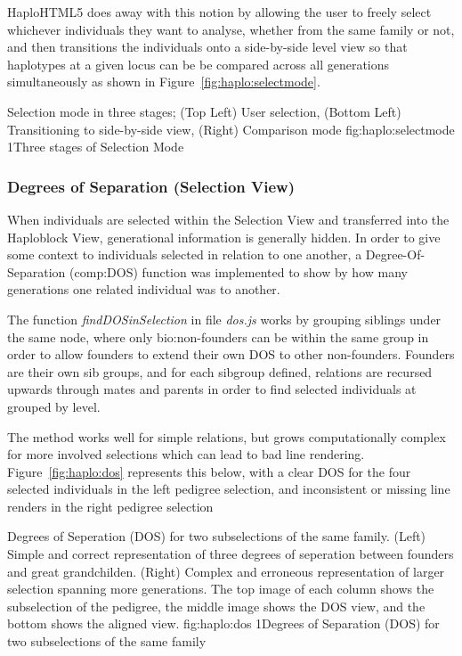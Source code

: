 HaploHTML5 does away with this notion by allowing the user to freely select whichever individuals they want to analyse, whether from the same family or not, and then transitions the individuals onto a side-by-side level view so that haplotypes at a given locus can be be compared across all generations simultaneously as shown in Figure~\ref{fig:haplo:selectmode}.

	{Selection mode in three stages; (Top Left) User selection, (Bottom Left) Transitioning to side-by-side view, (Right) Comparison mode}
	{fig:haplo:selectmode}
	{1}{Three stages of Selection Mode}


\subsubsection{Degrees of Separation (Selection View)}\label{ref:haplo:dos}

When individuals are selected within the Selection View and transferred into the Haploblock View, generational information is generally hidden. In order to give some context to individuals selected in relation to one another, a Degree-Of-Separation (\gls{comp:DOS}) function was implemented to show by how many generations one related individual was to another.

The function \textit{findDOSinSelection} in file \textit{dos.js} works by grouping siblings under the same node, where only \gls{bio:non-founders} can be within the same group in order to allow founders to extend their own DOS to other non-founders. Founders are their own sib groups, and for each sibgroup defined, relations are recursed upwards through mates and parents in order to find selected individuals at grouped by level.

The method works well for simple relations, but grows computationally complex for more involved selections which can lead to bad line rendering. Figure~\ref{fig:haplo:dos} represents this below, with a clear DOS for the four selected individuals in the left pedigree selection, and inconsistent or missing line renders in the right pedigree selection

	{Degrees of Seperation (DOS) for two subselections of the same family. (Left) Simple and correct representation of three degrees of seperation between founders and great grandchilden. (Right) Complex and erroneous representation of larger selection spanning more generations. The top image of each column shows the subselection of the pedigree, the middle image shows the DOS view, and the bottom shows the aligned view.}
	{fig:haplo:dos}
	{1}{Degrees of Separation (DOS) for two subselections of the same family}
	
